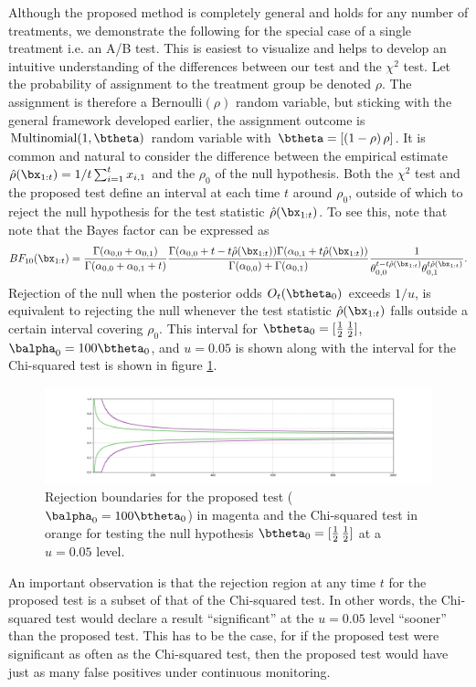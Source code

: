 \documentclass[11pt]{article}
\begin{document}
  Although the proposed method is completely general and holds for any number of treatments, we demonstrate the following for the special case of a single treatment i.e. an A/B test.
  This is easiest to visualize and helps to develop an intuitive understanding of the differences between our test and the $\chi^2$ test.
  Let the probability of assignment to the treatment group be denoted $\rho$.
The assignment is therefore a $\text{Bernoulli}(\rho)$ random variable, but sticking with the general framework developed earlier, the assignment outcome is $\text{Multinomial}(1,\btheta)$ random variable with $\btheta = [(1-\rho)\, \rho]$.
It is common and natural to consider the difference between the empirical estimate $\hat{\rho}(\bx_{1:t}) = 1/t \sum_{i=1}^{t} x_{i,1}$ and the $\rho_0$ of the null hypothesis.
Both the $\chi^2$ test and the proposed test define an interval at each time $t$ around $\rho_0$, outside of which to reject the null hypothesis for the test statistic $\hat{\rho}(\bx_{1:t})$.
To see this, note that note that the Bayes factor can be expressed as
\begin{equation}
  \label{eq:bayes_factor}
 BF_{10}(\bx_{1:t})  = \frac{\Gamma(\alpha_{0,0}+\alpha_{0,1})}{\Gamma(\alpha_{0,0}+\alpha_{0,1}+t)}\frac{\Gamma(\alpha_{0,0} + t-t\hat{\rho}(\bx_{1:t} ))\Gamma(\alpha_{0,1} + t\hat{\rho}(\bx_{1:t} )) }{\Gamma(\alpha_{0,0} )+\Gamma(\alpha_{0,1} )}\frac{1}{\theta_{0,0}^{t-t\hat{\rho}(\bx_{1:t})}\theta_{0,1}^{t\hat{\rho}(\bx_{1:t})}}.
\end{equation}
  Rejection of the null when the posterior odds $O_t(\btheta_0)$ exceeds $1/u$, is equivalent to rejecting the null whenever the test statistic $\hat{\rho}(\bx_{1:t})$ falls outside a certain interval covering $\rho_0$.
This interval for $\btheta_0 = [\frac{1}{2}\, \frac{1}{2}]$, $\balpha_0 = 100\btheta_0 $, and $u=0.05$ is shown along with the interval for the Chi-squared test is shown in figure \ref{fig:critical}.
\begin{figure}[H]
  \centering
  \includegraphics[scale=0.35]{images/critical_regions.png}
  \caption{Rejection boundaries for the proposed test ($\balpha_0 = 100\btheta_0$) in magenta and the Chi-squared test in orange for testing the null hypothesis $\btheta_0 = [\frac{1}{2} \, \frac{1}{2}]$ at a $u=0.05$ level.
}
    \label{fig:critical}
  \end{figure}
  An important observation is that the rejection region at any time $t$ for the proposed test is a subset of that of the Chi-squared test.
In other words, the Chi-squared test would declare a result ``significant'' at the $u=0.05$ level ``sooner'' than the proposed test.
This has to be the case, for if the proposed test were significant as often as the Chi-squared test, then the proposed test would have just as many false positives under continuous monitoring.
  
\end{document}
